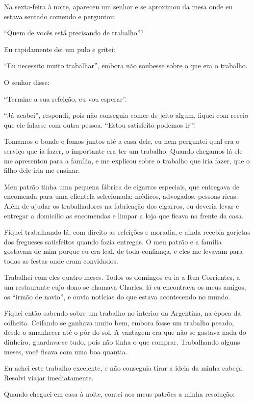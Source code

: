 Na sexta-feira à noite, apareceu um senhor e se aproximou da mesa onde
eu estava sentado comendo e perguntou:

``Quem de vocês está precisando de trabalho''?

Eu rapidamente dei um pulo e gritei:

``Eu necessito muito trabalhar'', embora não soubesse sobre o que era o
trabalho.

O senhor disse:

``Termine a sua refeição, eu vou esperar''.

``Já acabei'', respondi, pois não conseguia comer de jeito algum, fiquei
com receio que ele falasse com outra pessoa. ``Estou satisfeito podemos
ir''!

Tomamos o bonde e fomos juntos até a casa dele, eu nem perguntei qual
era o serviço que ia fazer, o importante era ter um trabalho. Quando
chegamos lá ele me apresentou para a família, e me explicou sobre o
trabalho que iria fazer, que o filho dele iria me ensinar.

Meu patrão tinha uma pequena fábrica de cigarros especiais, que
entregava de encomenda para uma clientela selecionada: médicos,
advogados, pessoas ricas. Além de ajudar os trabalhadores na fabricação
dos cigarros, eu deveria levar e entregar a domicilio as encomendas e
limpar a loja que ficava na frente da casa.

Fiquei trabalhando lá, com direito as refeições e moradia, e ainda
recebia gorjetas dos fregueses satisfeitos quando fazia entregas. O meu
patrão e a família gostavam de mim porque eu era leal, de toda
confiança, e eles me levavam para todas as festas onde eram convidados.

Trabalhei com eles quatro meses. Todos os domingos eu ia a Rua
Corrientes, a um restaurante cujo dono se chamava Charles, lá eu
encontrava os meus amigos, os ``irmão de navio'', e ouvia notícias do
que estava acontecendo no mundo.

Fiquei então sabendo sobre um trabalho no interior da Argentina, na
época da colheita. Ceifando se ganhava muito bem, embora fosse um
trabalho pesado, desde o amanhecer até o pôr do sol. A vantagem era que
não se gastava nada do dinheiro, guardava-se tudo, pois não tinha o que
comprar. Trabalhando alguns meses, você ficava com uma boa quantia.

Eu achei este trabalho excelente, e não conseguia tirar a ideia da minha
cabeça. Resolvi viajar imediatamente.

Quando cheguei em casa à noite, contei aos meus patrões a minha
resolução:

